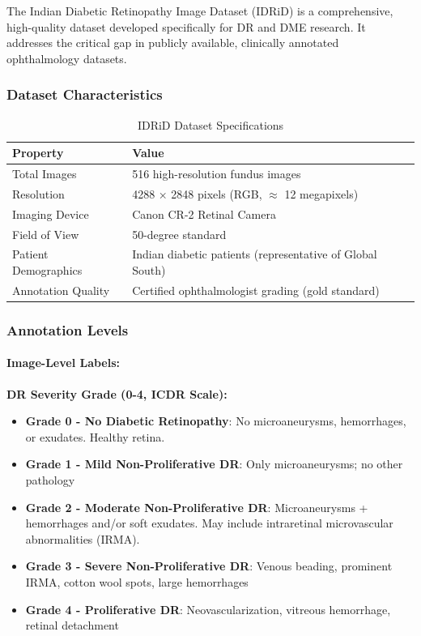 \documentclass[12pt,a4paper]{article}
\begin{document}
The Indian Diabetic Retinopathy Image Dataset (IDRiD) is a comprehensive, high-quality dataset developed specifically for DR and DME research. It addresses the critical gap in publicly available, clinically annotated ophthalmology datasets.

\subsubsection{Dataset Characteristics}

\begin{table}[H]
\centering
\small
\caption{IDRiD Dataset Specifications}
\begin{tabular}{|l|l|}
\hline
\textbf{Property} & \textbf{Value} \\
\hline
Total Images & 516 high-resolution fundus images \\
Resolution & 4288 × 2848 pixels (RGB, $\approx$ 12 megapixels) \\
Imaging Device & Canon CR-2 Retinal Camera \\
Field of View & 50-degree standard \\
Patient Demographics & Indian diabetic patients (representative of Global South) \\
Annotation Quality & Certified ophthalmologist grading (gold standard) \\
\hline
\end{tabular}
\end{table}

\subsubsection{Annotation Levels}

\paragraph{Image-Level Labels:}

\textbf{DR Severity Grade (0-4, ICDR Scale):}
\begin{itemize}
    \item \textbf{Grade 0 - No Diabetic Retinopathy}: No microaneurysms, hemorrhages, or exudates. Healthy retina.
    \item \textbf{Grade 1 - Mild Non-Proliferative DR}: Only microaneurysms; no other pathology
    \item \textbf{Grade 2 - Moderate Non-Proliferative DR}: Microaneurysms + hemorrhages and/or soft exudates. May include intraretinal microvascular abnormalities (IRMA).
    \item \textbf{Grade 3 - Severe Non-Proliferative DR}: Venous beading, prominent IRMA, cotton wool spots, large hemorrhages
    \item \textbf{Grade 4 - Proliferative DR}: Neovascularization, vitreous hemorrhage, retinal detachment
\end{itemize}
\end{document}
